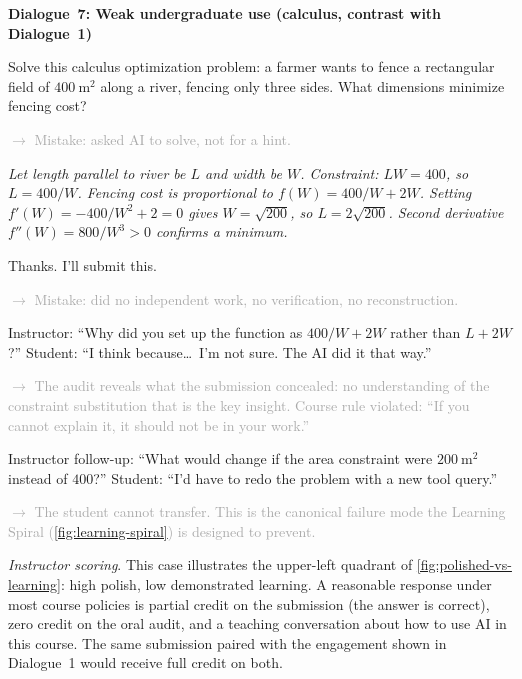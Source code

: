 \documentclass{SIAMbook2023}
\newenvironment{dialogue}[1]%
  {\par\medskip\noindent\textbf{\textcolor{guideblue}{#1}}\par\smallskip
   \begin{list}{}{\setlength{\leftmargin}{1.5em}\setlength{\rightmargin}{0.5em}\setlength{\itemsep}{0.4em}\setlength{\topsep}{0pt}}}
  {\end{list}\par\medskip}
\newcommand{\studentturn}[1]{\item[\textbf{Student.}] #1}
\newcommand{\aiturn}[1]{\item[\textbf{AI.}] \textit{#1}}
\newcommand{\dialogueannotate}[1]{\par\smallskip\hspace{2em}\textcolor{darkgray}{\footnotesize\textsf{$\rightarrow$ #1}}\par}
\begin{document}
\begin{dialogue}{Dialogue~7: Weak undergraduate use (calculus, contrast with Dialogue~1)}
\studentturn{Solve this calculus optimization problem: a farmer wants to fence a rectangular field of $400~\text{m}^2$ along a river, fencing only three sides. What dimensions minimize fencing cost?}
\dialogueannotate{Mistake: asked AI to solve, not for a hint.}

\aiturn{Let length parallel to river be $L$ and width be $W$. Constraint: $LW = 400$, so $L = 400/W$. Fencing cost is proportional to $f(W) = 400/W + 2W$. Setting $f'(W) = -400/W^2 + 2 = 0$ gives $W = \sqrt{200}$, so $L = 2\sqrt{200}$. Second derivative $f''(W) = 800/W^3 > 0$ confirms a minimum.}

\studentturn{Thanks. I'll submit this.}
\dialogueannotate{Mistake: did no independent work, no verification, no reconstruction.}

\studentturn{[At the random oral audit a week later.] Instructor: ``Why did you set up the function as $400/W + 2W$ rather than $L + 2W$?'' Student: ``I think because\dots\ I'm not sure. The AI did it that way.''}
\dialogueannotate{The audit reveals what the submission concealed: no understanding of the constraint substitution that is the key insight. Course rule violated: ``If you cannot explain it, it should not be in your work.''}

\studentturn{Instructor follow-up: ``What would change if the area constraint were $200~\text{m}^2$ instead of $400$?'' Student: ``I'd have to redo the problem with a new tool query.''}
\dialogueannotate{The student cannot transfer. This is the canonical failure mode the Learning Spiral (\cref{fig:learning-spiral}) is designed to prevent.}
\end{dialogue}

\noindent\textit{Instructor scoring}. This case illustrates the upper-left quadrant of \cref{fig:polished-vs-learning}: high polish, low demonstrated learning. A reasonable response under most course policies is partial credit on the submission (the answer is correct), zero credit on the oral audit, and a teaching conversation about how to use AI in this course. The same submission paired with the engagement shown in Dialogue~1 would receive full credit on both.
\end{document}
